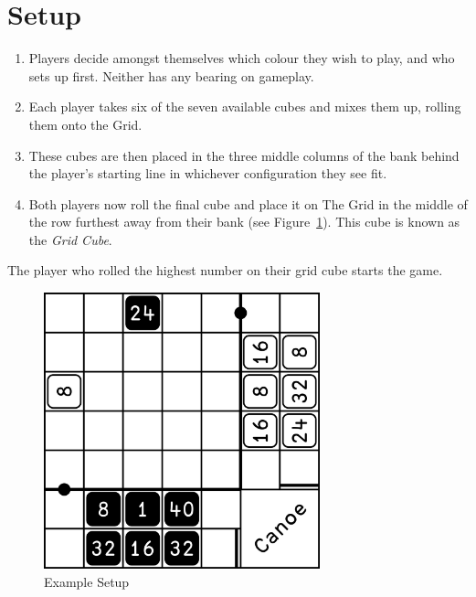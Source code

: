 \section{Setup}
\begin{enumerate}
    \item Players decide amongst themselves which colour they wish to play, and who sets up first. Neither has any bearing on gameplay.
    \item Each player takes six of the seven available cubes and mixes them up, rolling them onto the Grid.
    \item These cubes are then placed in the three middle columns of the bank behind the player's starting line in whichever configuration they see fit.
    \item Both players now roll the final cube and place it on The Grid in the middle of the row furthest away from their bank (see Figure~\ref{fig:setup}). This cube is known as the \textit{Grid Cube}.
\end{enumerate}
The player who rolled the highest number on their grid cube starts the game.

\begin{figure}[!h]
    \centering
    \includegraphics[width=8cm]{../graphics/setup}
    \caption{Example Setup}
    \label{fig:setup}
\end{figure}